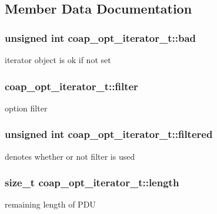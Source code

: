 \subsection{Member Data Documentation}
\hypertarget{structcoap__opt__iterator__t_a48cbd8005c37ff481fe7d10cfc1f4bb6}{}
\subsubsection[{bad}]{\setlength{\rightskip}{0pt plus 5cm}unsigned int coap\+\_\+opt\+\_\+iterator\+\_\+t\+::bad}\label{structcoap__opt__iterator__t_a48cbd8005c37ff481fe7d10cfc1f4bb6}
iterator object is ok if not set \hypertarget{structcoap__opt__iterator__t_a40a864c48b367abcaed1afa30621f405}{}
\subsubsection[{filter}]{ coap\+\_\+opt\+\_\+iterator\+\_\+t\+::filter}\label{structcoap__opt__iterator__t_a40a864c48b367abcaed1afa30621f405}
option filter \hypertarget{structcoap__opt__iterator__t_a6fed563dd49b61f28a275cd2f8c6f6a8}{}
\subsubsection[{filtered}]{\setlength{\rightskip}{0pt plus 5cm}unsigned int coap\+\_\+opt\+\_\+iterator\+\_\+t\+::filtered}\label{structcoap__opt__iterator__t_a6fed563dd49b61f28a275cd2f8c6f6a8}
denotes whether or not filter is used \hypertarget{structcoap__opt__iterator__t_a4f8dcbdb5373cb073b95f8c91a72cb0c}{}
\subsubsection[{length}]{\setlength{\rightskip}{0pt plus 5cm}size\+\_\+t coap\+\_\+opt\+\_\+iterator\+\_\+t\+::length}\label{structcoap__opt__iterator__t_a4f8dcbdb5373cb073b95f8c91a72cb0c}
remaining length of P\+D\+U \hypertarget{structcoap__opt__iterator__t_a05da7c127d28e7ba39d7186169596f6a}{}
